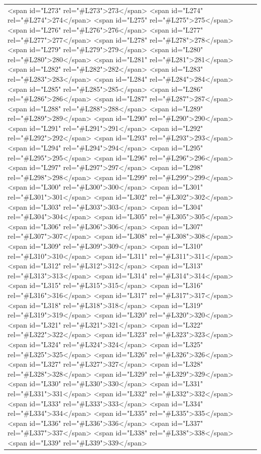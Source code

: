 \documentclass[a4paper,11pt,french]{article}
\begin{document}
\begin{tabular}{|m{8cm}|m{8cm}|}
<span id="L273" rel="#L273">273</span>
<span id="L274" rel="#L274">274</span>
<span id="L275" rel="#L275">275</span>
<span id="L276" rel="#L276">276</span>
<span id="L277" rel="#L277">277</span>
<span id="L278" rel="#L278">278</span>
<span id="L279" rel="#L279">279</span>
<span id="L280" rel="#L280">280</span>
<span id="L281" rel="#L281">281</span>
<span id="L282" rel="#L282">282</span>
<span id="L283" rel="#L283">283</span>
<span id="L284" rel="#L284">284</span>
<span id="L285" rel="#L285">285</span>
<span id="L286" rel="#L286">286</span>
<span id="L287" rel="#L287">287</span>
<span id="L288" rel="#L288">288</span>
<span id="L289" rel="#L289">289</span>
<span id="L290" rel="#L290">290</span>
<span id="L291" rel="#L291">291</span>
<span id="L292" rel="#L292">292</span>
<span id="L293" rel="#L293">293</span>
<span id="L294" rel="#L294">294</span>
<span id="L295" rel="#L295">295</span>
<span id="L296" rel="#L296">296</span>
<span id="L297" rel="#L297">297</span>
<span id="L298" rel="#L298">298</span>
<span id="L299" rel="#L299">299</span>
<span id="L300" rel="#L300">300</span>
<span id="L301" rel="#L301">301</span>
<span id="L302" rel="#L302">302</span>
<span id="L303" rel="#L303">303</span>
<span id="L304" rel="#L304">304</span>
<span id="L305" rel="#L305">305</span>
<span id="L306" rel="#L306">306</span>
<span id="L307" rel="#L307">307</span>
<span id="L308" rel="#L308">308</span>
<span id="L309" rel="#L309">309</span>
<span id="L310" rel="#L310">310</span>
<span id="L311" rel="#L311">311</span>
<span id="L312" rel="#L312">312</span>
<span id="L313" rel="#L313">313</span>
<span id="L314" rel="#L314">314</span>
<span id="L315" rel="#L315">315</span>
<span id="L316" rel="#L316">316</span>
<span id="L317" rel="#L317">317</span>
<span id="L318" rel="#L318">318</span>
<span id="L319" rel="#L319">319</span>
<span id="L320" rel="#L320">320</span>
<span id="L321" rel="#L321">321</span>
<span id="L322" rel="#L322">322</span>
<span id="L323" rel="#L323">323</span>
<span id="L324" rel="#L324">324</span>
<span id="L325" rel="#L325">325</span>
<span id="L326" rel="#L326">326</span>
<span id="L327" rel="#L327">327</span>
<span id="L328" rel="#L328">328</span>
<span id="L329" rel="#L329">329</span>
<span id="L330" rel="#L330">330</span>
<span id="L331" rel="#L331">331</span>
<span id="L332" rel="#L332">332</span>
<span id="L333" rel="#L333">333</span>
<span id="L334" rel="#L334">334</span>
<span id="L335" rel="#L335">335</span>
<span id="L336" rel="#L336">336</span>
<span id="L337" rel="#L337">337</span>
<span id="L338" rel="#L338">338</span>
<span id="L339" rel="#L339">339</span>

\end{tabular}
\end{document}
